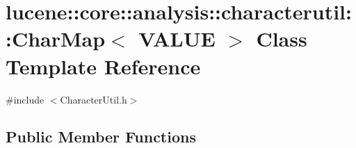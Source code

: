 \hypertarget{classlucene_1_1core_1_1analysis_1_1characterutil_1_1CharMap}{}\section{lucene\+:\+:core\+:\+:analysis\+:\+:characterutil\+:\+:Char\+Map$<$ V\+A\+L\+UE $>$ Class Template Reference}
\label{classlucene_1_1core_1_1analysis_1_1characterutil_1_1CharMap}


{\ttfamily \#include $<$Character\+Util.\+h$>$}

\subsection*{Public Member Functions}

